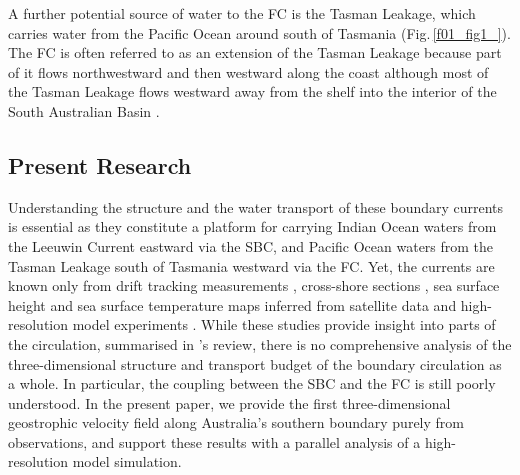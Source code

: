 \documentclass[preprint,3p,review,12pt]{elsarticle}
\newcommand{\citepos}[1]{\citeauthor{#1}'s \citeyearpar{#1}}
\begin{document}
A further potential source of water to the FC is the Tasman Leakage, which carries water from the Pacific Ocean around south of Tasmania (Fig.\,\ref{f01_fig1_}). The FC is often referred to as an extension of the Tasman Leakage because part of it flows northwestward and then westward along the coast \citep{Feng2016,Middleton2002,Rosell-Fieschi2013} although most of the Tasman Leakage flows westward away from the shelf into the interior of the South Australian Basin \citep{Speich2002,vanSebille2012,vanSebille2014}.

\subsection{Present Research} \label{Present Research}
Understanding the structure and the water transport of these boundary currents is essential as they constitute a platform for carrying Indian Ocean waters from the Leeuwin Current eastward via the SBC, and Pacific Ocean waters from the Tasman Leakage south of Tasmania westward via the FC\@. 
Yet, the currents are known only from drift tracking measurements \citep{Godfrey1986,Cresswell2004}, cross-shore sections \citep{Cresswell1993}, sea surface height and sea surface temperature maps inferred from satellite data \citep{Legeckis1981,Ridgway2004} and high-resolution model experiments \citep{Middleton2002,Middleton2003,Cirano2004,Batteen2009}. While these studies provide insight into parts of the circulation, summarised in \citepos{Middleton2007} review, there is no comprehensive analysis of the three-dimensional structure and transport budget of the boundary circulation as a whole. In particular, the coupling between the SBC and the FC is still poorly understood. In the present paper, we provide the first three-dimensional geostrophic velocity field along Australia's southern boundary purely from observations, and support these results with a parallel analysis of a high-resolution model simulation.
\end{document}
